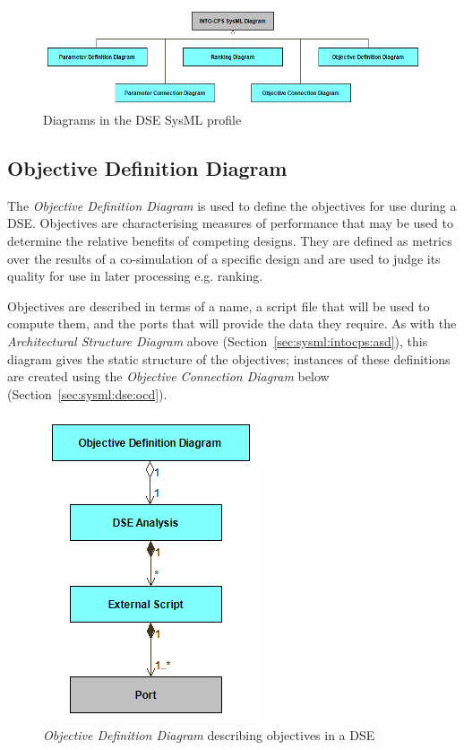 \begin{figure}[h!]
\centering
\includegraphics[scale=0.5]{figures/DSE/DSEViews}
\caption{Diagrams in the DSE SysML profile}
\label{fig:sysml:dse}
\end{figure}

\subsection{Objective Definition Diagram}
\label{sec:sysml:dse:odd}

The \emph{Objective Definition Diagram} is used to define the objectives for use during a DSE. Objectives are characterising measures of performance that may be used to determine the relative benefits of competing designs. They are defined as metrics over the results of a co-simulation of a specific design and are used to judge its quality for use in later processing e.g. ranking.

Objectives are described in terms of a name, a script file that will be used to compute them, and the ports that will provide the data they require. As with the \emph{Architectural Structure Diagram} above (Section~\ref{sec:sysml:intocps:asd}), this diagram gives the static structure of the objectives; instances of these definitions are created using the \emph{Objective Connection Diagram} below (Section~\ref{sec:sysml:dse:ocd}).

\begin{figure}[h!]
\centering
\includegraphics[scale=0.5]{figures/DSE/ObjectiveDefinitionView}
\caption{\emph{Objective Definition Diagram} describing objectives in a DSE}
\label{fig:sysml:sysml:dse:odd}
\end{figure}

